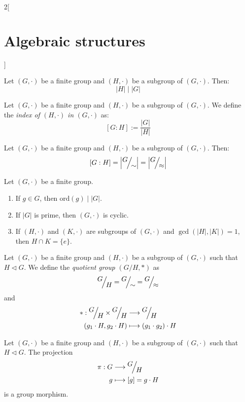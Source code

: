 \documentclass[../../../main.tex]{subfiles}
\begin{document}
\begin{multicols}{2}[\section{Algebraic structures}]
\begin{theorem}
    Let $(G,\cdot)$ be a finite group and $(H,\cdot)$ be a subgroup of $(G,\cdot)$. Then: $$|H|\mid|G|$$
  \end{theorem}
  \begin{definition}
    Let $(G,\cdot)$ be a finite group and $(H,\cdot)$ be a subgroup of $(G,\cdot)$. We define the \textit{index of $(H,\cdot)$ in $(G,\cdot)$} as: $$[G:H]:=\frac{|G|}{|H|}$$
  \end{definition}
  \begin{corollary}
    Let $(G,\cdot)$ be a finite group and $(H,\cdot)$ be a subgroup of $(G,\cdot)$. Then: $$[G:H]=\left|\quot{G}{\sim}\right|=\left|\quot{G}{\approx}\right|$$
  \end{corollary}
  \begin{corollary}
    Let $(G,\cdot)$ be a finite group.
    \begin{enumerate}
      \item If $g\in G$, then $\text{ord}(g)\mid |G|$.
      \item If $|G|$ is prime, then $(G,\cdot)$ is cyclic.
      \item If $(H,\cdot)$ and $(K,\cdot)$ are subgroups of $(G,\cdot)$ and $\gcd(|H|,|K|)=1$, then $H\cap K=\{e\}$.
    \end{enumerate}
  \end{corollary}
  \begin{definition}
    Let $(G,\cdot)$ be a finite group and $(H,\cdot)$ be a subgroup of $(G,\cdot)$ such that $H\lhd G$. We define the \textit{quotient group $\left(G/H,*\right)$} as $$\quot{G}{H}=\quot{G}{\sim}=\quot{G}{\approx}$$ and
    \begin{align*}
      *:\quot{G}{H}\times\quot{G}{H} & \longrightarrow\quot{G}{H}        \\
      (g_1\cdot H,g_2\cdot H)        & \longmapsto (g_1\cdot g_2)\cdot H
    \end{align*}
  \end{definition}
  \begin{lemma}
    Let $(G,\cdot)$ be a finite group and $(H,\cdot)$ be a subgroup of $(G,\cdot)$ such that $H\lhd G$. The projection
    \begin{align*}
      \pi:G & \longrightarrow\quot{G}{H} \\
      g     & \longmapsto[g]=g\cdot H
    \end{align*}
    is a group morphism.
  \end{lemma}

\end{multicols}
\end{document}
